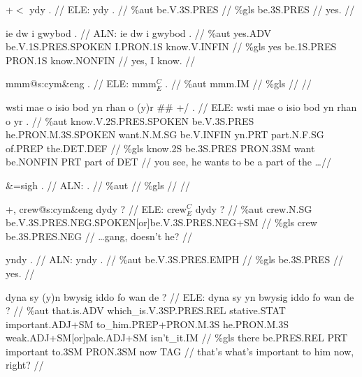 \documentclass[a4paper,10pt]{article}
\begin{document}
\ex
\begingl[lingstyle=gergl]
\glchat +$<$ ydy . //
\glsurface ELE:  ydy .  //
\glauto \%aut  be{\scriptsize .V.3S.PRES}   //
\glmanual \%gls  be{\scriptsize .3S.PRES}   //
\gleng yes. //
\endgl
\xe

\ex
\begingl[lingstyle=gergl]
\glchat ie dw i gwybod . //
\glsurface ALN:  ie dw i gwybod .  //
\glauto \%aut  yes{\scriptsize .ADV} be{\scriptsize .V.1S.PRES.SPOKEN} I{\scriptsize .PRON.1S} know{\scriptsize .V.INFIN}   //
\glmanual \%gls  yes be{\scriptsize .1S.PRES} PRON{\scriptsize .1S} know{\scriptsize .NONFIN}   //
\gleng yes, I know. //
\endgl
\xe

\ex
\begingl[lingstyle=gergl]
\glchat mmm@s:cym\&eng . //
\glsurface ELE:  mmm$^{C}_{E}$ .  //
\glauto \%aut  mmm{\scriptsize .IM}   //
\glmanual \%gls     //
\gleng  //
\endgl
\xe

\ex
\begingl[lingstyle=gergl]
\glchat wsti mae o isio bod yn rhan o (y)r \#\# +/ . //
\glsurface ELE:  wsti mae o isio bod yn rhan o yr .  //
\glauto \%aut  know{\scriptsize .V.2S.PRES.SPOKEN} be{\scriptsize .V.3S.PRES} he{\scriptsize .PRON.M.3S.SPOKEN} want{\scriptsize .N.M.SG} be{\scriptsize .V.INFIN} yn{\scriptsize .PRT} part{\scriptsize .N.F.SG} of{\scriptsize .PREP} the{\scriptsize .DET.DEF}   //
\glmanual \%gls  know{\scriptsize .2S} be{\scriptsize .3S.PRES} PRON{\scriptsize .3SM} want be{\scriptsize .NONFIN} PRT part of DET   //
\gleng you see, he wants to be a part of the \dots  //
\endgl
\xe

\ex
\begingl[lingstyle=gergl]
\glchat \&=sigh . //
\glsurface ALN:  .  //
\glauto \%aut    //
\glmanual \%gls    //
\gleng  //
\endgl
\xe

\ex
\begingl[lingstyle=gergl]
\glchat +, crew@s:cym\&eng dydy ? //
\glsurface ELE:  crew$^{C}_{E}$ dydy ?  //
\glauto \%aut  crew{\scriptsize .N.SG} be{\scriptsize .V.3S.PRES.NEG.SPOKEN[or]be.V.3S.PRES.NEG+SM}   //
\glmanual \%gls  crew be{\scriptsize .3S.PRES.NEG}   //
\gleng  \dots gang, doesn't he? //
\endgl
\xe

\ex
\begingl[lingstyle=gergl]
\glchat yndy . //
\glsurface ALN:  yndy .  //
\glauto \%aut  be{\scriptsize .V.3S.PRES.EMPH}   //
\glmanual \%gls  be{\scriptsize .3S.PRES}   //
\gleng yes. //
\endgl
\xe

\ex
\begingl[lingstyle=gergl]
\glchat dyna sy (y)n bwysig iddo fo wan de ? //
\glsurface ELE:  dyna sy yn bwysig iddo fo wan de ?  //
\glauto \%aut  that{\scriptsize .is.ADV} which\_is{\scriptsize .V.3SP.PRES.REL} stative{\scriptsize .STAT} important{\scriptsize .ADJ+SM} to\_him{\scriptsize .PREP+PRON.M.3S} he{\scriptsize .PRON.M.3S} weak{\scriptsize .ADJ+SM[or]pale.ADJ+SM} isn't\_it{\scriptsize .IM}   //
\glmanual \%gls  there be{\scriptsize .PRES.REL} PRT important to{\scriptsize .3SM} PRON{\scriptsize .3SM} now TAG   //
\gleng that's what's important to him now, right? //
\endgl
\xe
\end{document}

